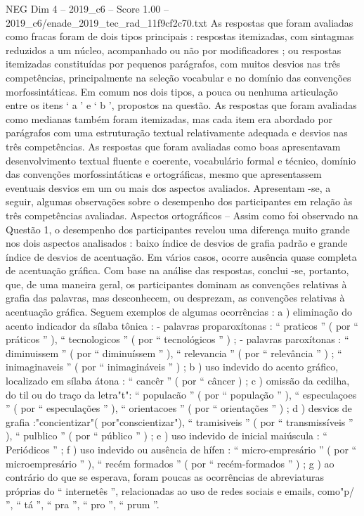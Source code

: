 \begin{textsample}{NEG Dim 4 – 2019\_c6 – Score 1.00 – 2019\_c6/enade\_2019\_tec\_rad\_11f9cf2c70.txt}
As respostas que foram avaliadas como fracas foram de dois tipos principais : respostas itemizadas, com sintagmas reduzidos a um núcleo, acompanhado ou não por modificadores ; ou respostas itemizadas constituídas por pequenos parágrafos, com muitos desvios nas três competências, principalmente na seleção vocabular e no domínio das convenções morfossintáticas.
Em comum nos dois tipos, a pouca ou nenhuma articulação entre os itens ‘ a ’ e ‘ b ’, propostos na questão.
As respostas que foram avaliadas como medianas também foram itemizadas, mas cada item era abordado por parágrafos com uma estruturação textual relativamente adequada e desvios nas três competências.
As respostas que foram avaliadas como boas apresentavam desenvolvimento textual fluente e coerente, vocabulário formal e técnico, domínio das convenções morfossintáticas e ortográficas, mesmo que apresentassem eventuais desvios em um ou mais dos aspectos avaliados.
Apresentam -se, a seguir, algumas observações sobre o desempenho dos participantes em relação às três competências avaliadas.
Aspectos ortográficos – Assim como foi observado na Questão 1, o desempenho dos participantes revelou uma diferença muito grande nos dois aspectos analisados : baixo índice de desvios de grafia padrão e grande índice de desvios de acentuação.
Em vários casos, ocorre ausência quase completa de acentuação gráfica.
Com base na análise das respostas, conclui -se, portanto, que, de uma maneira geral, os participantes dominam as convenções relativas à grafia das palavras, mas desconhecem, ou desprezam, as convenções relativas à acentuação gráfica.
Seguem exemplos de algumas ocorrências : a ) eliminação do acento indicador da sílaba tônica : - palavras proparoxítonas : “ praticos ” ( por “ práticos ” ), “ tecnologicos ” ( por “ tecnológicos ” ) ; - palavras paroxítonas : “ diminuissem ” ( por “ diminuíssem ” ), “ relevancia ” ( por “ relevância ” ) ; “ inimaginaveis ” ( por “ inimagináveis ” ) ; b ) uso indevido do acento gráfico, localizado em sílaba átona : “ cancêr ” ( por “ câncer ) ; c ) omissão da cedilha, do til ou do traço da letra"t": “ populacão ” ( por “ população ” ), “ especulaçoes ” ( por “ especulações ” ), “ orientacoes ” ( por “ orientações ” ) ; d ) desvios de grafia :"concientizar"( por"conscientizar"), “ tramisiveis ” ( por “ transmissíveis ” ), “ pulblico ” ( por “ público ” ) ; e ) uso indevido de inicial maiúscula : “ Periódicos ” ; f ) uso indevido ou ausência de hífen : “ micro-empresário ” ( por “ microempresário ” ), “ recém formados ” ( por “ recém-formados ” ) ; g ) ao contrário do que se esperava, foram poucas as ocorrências de abreviaturas próprias do “ internetês ”, relacionadas ao uso de redes sociais e emails, como"p/ ”, “ tá ”, “ pra ”, “ pro ”, “ prum ”.

\end{textsample}
